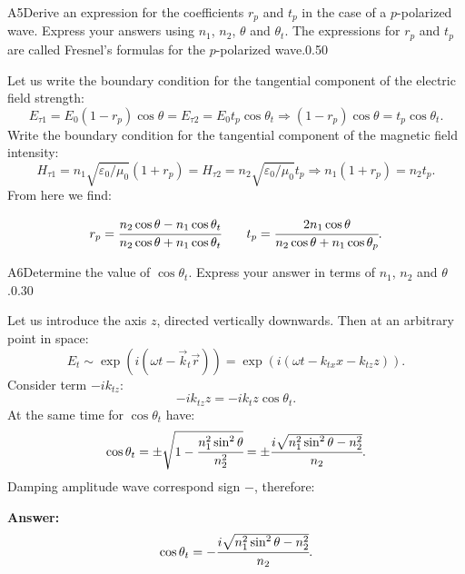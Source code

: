 \documentclass[11pt,a4paper]{article}
\begin{document}
\begin{solcard}{A5}{Derive an expression for the coefficients $r_p$ and $t_p$ in the case of a $p$-polarized wave. Express your answers using $n_1$, $n_2$, $\theta$ and $\theta_t$. The expressions for $r_p$ and $t_p$ are called Fresnel's formulas for the $p$-polarized wave.}{0.50}

Let us write the boundary condition for the tangential component of the electric field strength: $$E_{\tau 1}=E_0(1-r_p)\cos\theta=E_{\tau 2}=E_0t_p\cos\theta_t\Rightarrow (1-r_p)\cos\theta=t_p\cos\theta_t{.} $$Write the boundary condition for the tangential component of the magnetic field intensity: $$H_{\tau 1}=n_1\sqrt{\varepsilon_0/\mu_0}(1+r_p)=H_{\tau 2}=n_2\sqrt{\varepsilon_0/\mu_0}t_p\Rightarrow n_1(1+r_p)=n_2t_p{.} $$From here we find:


$$r_p=\cfrac{n_2\cos\theta-n_1\cos\theta_t}{n_2\cos\theta+n_1\cos\theta_t}\qquad t_p=\cfrac{2n_1\cos\theta}{n_2\cos\theta+n_1\cos\theta_p}{.} $$

\end{solcard}

\begin{solcard}{A6}{Determine the value of $\cos\theta_t$. Express your answer in terms of $n_1$, $n_2$ and $\theta$.}{0.30}

Let us introduce the axis $z$, directed vertically downwards. Then at an arbitrary point in space: $$E_t\sim \exp\left(i\left(\omega t-\vec{k}_t\vec{r}\right)\right)=\exp\left(i\left(\omega t-k_{tx}x-k_{tz}z\right)\right){.} $$Consider term $-ik_{tz}$: $$-ik_{tz}z=-ik_tz\cos\theta_t{.} $$At the same time for $\cos\theta_t$ have: $$\cos\theta_t=\pm\sqrt{1-\cfrac{n^2_1\sin^2\theta}{n^2_2}}=\pm \cfrac{i\sqrt{n^2_1\sin^2\theta-n^2_2}}{n_2}{.} $$Damping amplitude wave correspond sign $-$, therefore:

\par\smallskip\noindent\textbf{Answer:} $$\cos\theta_t=- \cfrac{i\sqrt{n^2_1\sin^2\theta-n^2_2}}{n_2}{.} $$
\end{solcard}
\end{document}
